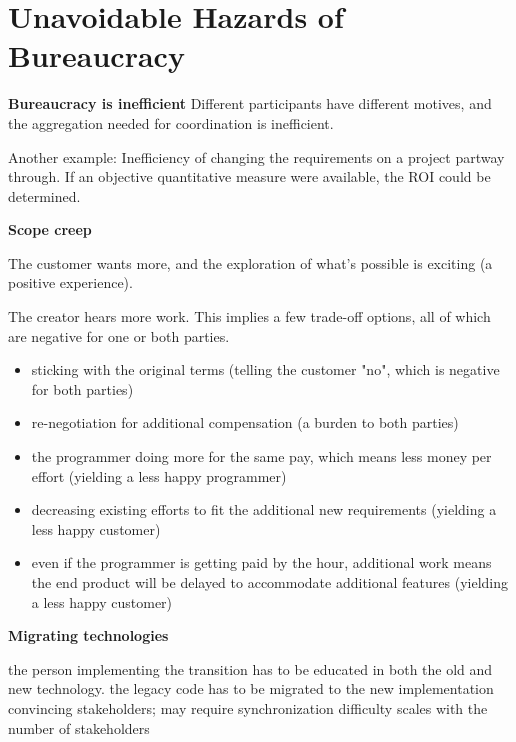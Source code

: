 \section{Unavoidable Hazards of Bureaucracy\label{sec:unavoidable_hazards}}

\textbf{Bureaucracy is inefficient}
Different participants have different motives, and the aggregation needed for coordination is inefficient.

Another example: Inefficiency of changing the requirements on a project partway through. If an objective quantitative measure were available, the ROI could be determined. 



\textbf{Scope creep}

The customer wants more, and the exploration of what's possible is exciting (a positive experience).

The creator hears more work. This implies a few trade-off options, all of which are negative for one or both parties.
\begin{itemize}
    \item sticking with the original terms (telling the customer "no", which is negative for both parties)
    \item re-negotiation for additional compensation (a burden to both parties)
    \item the programmer doing more for the same pay, which means less money per effort (yielding a less happy programmer)
    \item decreasing existing efforts to fit the additional new requirements (yielding a less happy customer)
    \item even if the programmer is getting paid by the hour, additional work means the end product will be delayed to accommodate additional features (yielding a less happy customer)
\end{itemize}


\textbf{Migrating technologies}

the person implementing the transition has to be educated in both the old and new technology. 
the legacy code has to be migrated to the new implementation
convincing stakeholders; may require synchronization
difficulty scales with the number of stakeholders 